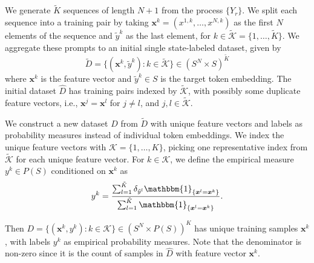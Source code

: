 \documentclass{article}
\begin{document}



We generate $\tilde K$ sequences of length $N+1$ from the process $\{Y_r\}$. We split each sequence into a training pair by taking $\bm{x}^k = (x^{1, k}, \dots, x^{N, k})$ as the first $N$ elements of the sequence and $\tilde y^k$ as the last element, for $k \in \tilde {\mathcal{K}} = \{1, \dots , \tilde K\}$. We aggregate these prompts to an initial single state-labeled dataset, given by 
$$\tilde D = \{(\bm{x}^k, \tilde y^k):k \in \tilde {\mathcal{K}} \} \in (S^N \times S)^{\tilde K}$$
where $\bm{x}^k$ is the feature vector and $\tilde{y}^k \in S$ is the target token embedding. The initial dataset $\hat D$ has training pairs indexed by $\tilde {\mathcal{K}}$, with possibly some duplicate feature vectors, i.e., $\bm{x}^j = \bm{x}^l$ for $j\neq l$, and $j, l \in \tilde {\mathcal{K}}$. 

We construct a new dataset $D$ from $\tilde D$ with unique feature vectors and labels as probability measures instead of individual token embeddings. 
We index the unique feature vectors with $\mathcal{K} = \{1, \dots, K\}$, picking one representative index from $\tilde {\mathcal{K}}$ for each unique feature vector. For $k \in \mathcal{K}$, we define the empirical measure $y^k \in P(S)$ conditioned on $\bm{x}^k$ as  
$$y^k = \frac{
\sum_{l=1}^{\tilde {K}} \delta _ {\tilde y^l} \mathbbm{1}_{\{\bm{x}^l = \bm{x}^k\}}
}{\sum_{l=1}^{\tilde {K}} \mathbbm{1}_{\{\bm{x}^l = \bm{x}^k\}}
}
.$$

Then $D = \{(\bm{x}^k, y^k):k \in \mathcal{K}\} \in (S^N \times P(S))^K$ has unique training samples $\bm{x}^k$, with labels $y^k$ as empirical probability measures. Note that the denominator is non-zero since it is the count of samples in $\hat D$ with feature vector $\bm{x}^k$.
\end{document}
